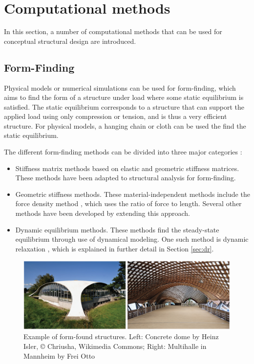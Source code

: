 \chapter{Computational methods}
\label{ch:Computational methods}
In this section, a number of computational methods that can be used for conceptual structural design are introduced. 

\section{Form-Finding}
Physical models or numerical simulations can be used for form-finding, which aims to find the form of a structure under load where some static equilibrium is satisfied. The static equilibrium corresponds to a structure that can support the applied load using only compression or tension, and is thus a very efficient structure. For physical models, a hanging chain or cloth can be used the find the static equilibrium.

The different form-finding methods can be divided into three major categories \cite{Veenendaal2012a}: 

\begin{itemize} 
\item Stiffness matrix methods based on elastic and geometric stiffness matrices. These methods have been adapted to structural analysis for form-finding.
\item Geometric stiffness methods. These material-independent methods include the force density method \cite{Schek1974}, which uses the ratio of force to length. Several other methods have been developed by extending this approach.
\item Dynamic equilibrium methods. These methods find the steady-state equilibrium through use of dynamical modeling. One such method is dynamic relaxation \cite{Day1965}, which is explained in further detail in Section \ref{sec:dr}.
\end{itemize} 

\begin{figure}
  \includegraphics[width=380pt]{graphics/formfinding-ex.jpg}
  \caption{Example of form-found structures. Left: Concrete dome by Heinz Isler, © Chriusha, Wikimedia Commons; Right: Multihalle in Mannheim by Frei Otto }
  \label{fig:Stevin}
\end{figure}

